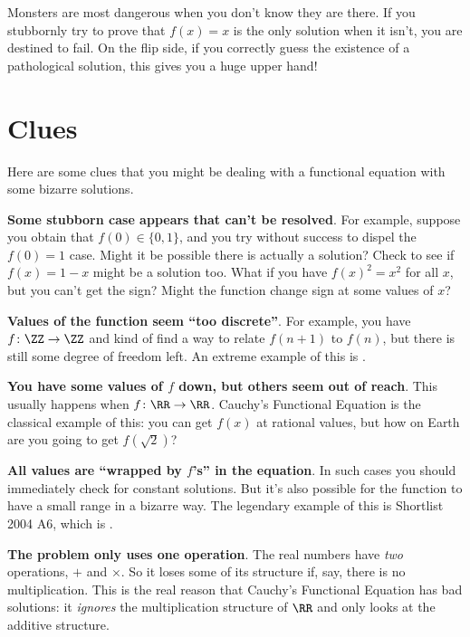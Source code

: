 \documentclass[11pt]{scrartcl}
\begin{document}
Monsters are most dangerous when you don't know they are there.
If you stubbornly try to prove that $f(x) = x$ is the only solution when it isn't,
you are destined to fail.
On the flip side, if you correctly guess the existence of a pathological solution,
this gives you a huge upper hand!

\section{Clues}
Here are some clues that you might be dealing with a
functional equation with some bizarre solutions.

\begin{itemize}
  \ii \textbf{Some stubborn case appears that can't be resolved}.
  For example, suppose you obtain that $f(0) \in \{0,1\}$,
  and you try without success to dispel the $f(0) = 1$ case.
  Might it be possible there is actually a solution?
  Check to see if $f(x) = 1-x$ might be a solution too.
  What if you have $f(x)^2 = x^2$ for all $x$, but you can't get the sign?
  Might the function change sign at some values of $x$?

  \ii \textbf{Values of the function seem ``too discrete''}.
  For example, you have $f \colon \ZZ \to \ZZ$ and kind of find a way to relate $f(n+1)$
  to $f(n)$, but there is still some degree of freedom left.
  An extreme example of this is .

  \ii \textbf{You have some values of $f$ down, but others seem out of reach}.
  This usually happens when $f \colon \RR \to \RR$.
  Cauchy's Functional Equation is the classical example of this:
  you can get $f(x)$ at rational values, but how on Earth are you going
  to get $f(\sqrt 2)$?

  \ii \textbf{All values are ``wrapped by $f$'s'' in the equation}.
  In such cases you should immediately check for constant solutions.
  But it's also possible for the function to have a small range
  in a bizarre way.
  The legendary example of this is Shortlist 2004 A6,
  which is .

  \ii \textbf{The problem only uses one operation}.
  The real numbers have \emph{two} operations, $+$ and $\times$.
  So it loses some of its structure if, say, there is no multiplication.
  This is the real reason that Cauchy's Functional Equation has bad solutions:
  it \emph{ignores} the multiplication structure of $\RR$
  and only looks at the additive structure.
\end{itemize}
\end{document}
